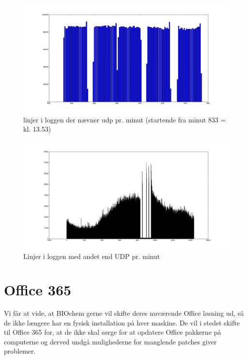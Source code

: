 \documentclass[10pt,a4paper,danish]{article}
\begin{document}
\begin{figure}[h!]
  \centering
  \includegraphics[width=\textwidth]{udp-activity.png}
  \caption{linjer i loggen der nævner udp pr. minut (startende fra minut 833 = kl. 13.53)}
  \label{fig:ddos-udp-activity}
\end{figure}

\begin{figure}[h!]
  \centering
  \includegraphics[width=\textwidth]{non-udp-activity.png}
  \caption{Linjer i loggen med andet end UDP pr. minut}
  \label{fig:ddos-non-udp-activity}
\end{figure}

\newpage

\section{Office 365}
Vi får at vide, at BIOchem gerne vil skifte deres nuværende Office løsning ud,
så de ikke længere har en fysisk installation på hver maskine.
De vil i stedet skifte til Office 365 for, at de ikke skal sørge for at opdatere
Office pakkerne på computerne og derved undgå mulighederne for manglende patches
giver problemer.
\end{document}
